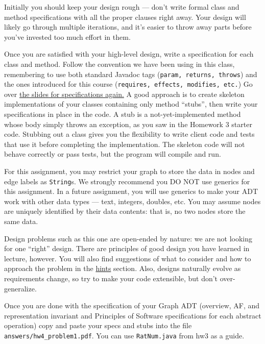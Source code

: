 \documentclass[11pt]{article}
\begin{document}
\noindent Initially you should keep your design rough — don't write formal class and method specifications with all the proper clauses right away. Your design will likely go through multiple iterations, and it's easier to throw away parts before you've invested too much effort in them.

\noindent Once you are satisfied with your high-level design, write a specification for each class and method. Follow the convention we have been using in this class, remembering to use both standard Javadoc tags (\texttt{param, returns, throws}) and the ones introduced for this course (\texttt{requires, effects, modifies, etc.}) Go over \href{https://www.cs.rpi.edu/academics/courses/spring23/csci2600/Slides/Specifications.pdf}{the slides for specifications again.} A good approach is to create skeleton implementations of your classes containing only method “stubs”, then write your specifications in place in the code. A stub is a not-yet-implemented method whose body simply throws an exception, as you saw in the Homework 3 starter code. Stubbing out a class gives you the flexibility to write client code and tests that use it before completing the implementation. The skeleton code will not behave correctly or pass tests, but the program will compile and run.

\noindent For this assignment, you may restrict your graph to store the data in nodes and edge labels as \texttt{String}s. We strongly recommend you DO NOT use generics for this assignment. In a future assignment, you will use generics to make your ADT work with other data types — text, integers, doubles, etc. You may assume nodes are uniquely identified by their data contents: that is, no two nodes store the same data.

\noindent Design problems such as this one are open-ended by nature: we are not looking for one “right” design. There are principles of good design you have learned in lecture, however. You will also find suggestions of what to consider and how to approach the problem in the \hyperref[sec:Hints]{hints} section. Also, designs naturally evolve as requirements change, so try to make your code extensible, but don't over-generalize.

\noindent Once you are done with the specification of your Graph ADT (overview, AF, and representation invariant and Principles of Software specifications for each abstract operation) copy and paste your specs and stubs into the file \texttt{answers/hw4\_problem1.pdf}. You can use \texttt{RatNum.java} from hw3 as a guide.
\end{document}
